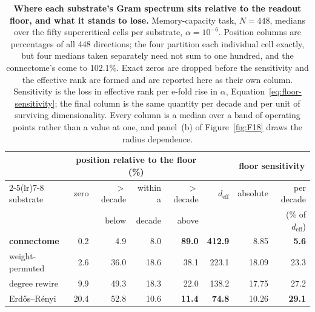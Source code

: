 \begin{table}[ht]
    \centering
    \caption[Where each substrate's Gram spectrum sits relative to the readout
    floor]{\textbf{Where each substrate's Gram spectrum sits relative to the
    readout floor, and what it stands to lose.} Memory-capacity task, $N = 448$, %
    medians over the fifty supercritical cells per substrate,
    $\alpha = 10^{-6}$. %
    Position columns are percentages of all 448 directions; the four partition
    each individual cell exactly, but four medians taken separately need not sum
    to one hundred, and the connectome's come to
    102.1\%. %
    Exact zeros are dropped before the sensitivity and the effective rank are
    formed and are reported here as their own
    column. %
    Sensitivity is the loss in effective rank per e-fold rise in $\alpha$,
    Equation~\ref{eq:floor-sensitivity}; the final column is the same quantity
    per decade and per unit of surviving dimensionality. Every column is a
    median over a band of operating points rather than a value at one, and
    panel~(b) of Figure~\ref{fig:F18} draws the radius dependence.}
    \label{tab:act2-floor}
    \begin{tabular}{lrrrrrrr}
        \toprule
        & \multicolumn{4}{c}{position relative to the floor (\%)} & & \multicolumn{2}{c}{floor sensitivity} \\
        \cmidrule(lr){2-5}\cmidrule(lr){7-8}
        substrate & zero & $>$ decade & within a & $>$ decade & $d_{\mathrm{eff}}$ & absolute & per decade \\
        & & below & decade & above & & & (\% of $d_{\mathrm{eff}}$) \\
        \midrule
        \textbf{connectome} & 0.2 & 4.9 & 8.0 & \textbf{89.0} & \textbf{412.9} & 8.85 & \textbf{5.6} \\ %
        weight-permuted & 2.6 & 36.0 & 18.6 & 38.1 & 223.1 & 18.09 & 23.3 \\ %
        degree rewire & 9.9 & 49.3 & 18.3 & 22.0 & 138.2 & 17.75 & 27.2 \\ %
        Erdős--Rényi & 20.4 & 52.8 & 10.6 & \textbf{11.4} & \textbf{74.8} & 10.26 & \textbf{29.1} \\ %
        \bottomrule
    \end{tabular}
\end{table}



